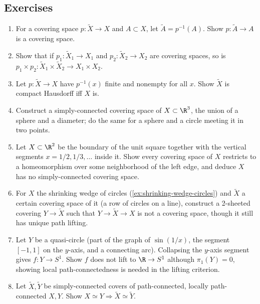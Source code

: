 \subsection*{Exercises}

\begin{enumerate}
\item For a covering space $p:\tilde X\to X$ and $A\subset X$, let $\tilde A=p^{-1}(A)$.
Show $p:\tilde A\to A$ is a covering space.

\item Show that if $p_1:\tilde X_1\to X_1$ and $p_2:\tilde X_2\to X_2$ are covering
spaces, so is $p_1\times p_2 : \tilde X_1\times\tilde X_2 \to X_1\times X_2$.

\item Let $p:\tilde X\to X$ have $p^{-1}(x)$ finite and nonempty for all $x$. Show
$\tilde X$ is compact Hausdorff iff $X$ is.

\item Construct a simply-connected covering space of $X\subset\R^3$, the union of
a sphere and a diameter; do the same for a sphere and a circle meeting it in two
points.

\item Let $X\subset\R^2$ be the boundary of the unit square together with the
vertical segments $x=1/2,1/3,\ldots$ inside it. Show every covering space of $X$
restricts to a homeomorphism over some neighborhood of the left edge, and deduce
$X$ has no simply-connected covering space.

\item For $X$ the shrinking wedge of circles (\cref{ex:shrinking-wedge-circles}) and
$\tilde X$ a certain covering space of it (a row of circles on a line), construct a
2-sheeted covering $Y\to\tilde X$ such that $Y\to\tilde X\to X$ is not a covering
space, though it still has unique path lifting.

\item Let $Y$ be a quasi-circle (part of the graph of $\sin(1/x)$, the segment
$[-1,1]$ on the $y$-axis, and a connecting arc). Collapsing the $y$-axis segment
gives $f:Y\to S^1$. Show $f$ does not lift to $\R\to S^1$ although $\pi_1(Y)=0$,
showing local path-connectedness is needed in the lifting criterion.

\item Let $\tilde X,\tilde Y$ be simply-connected covers of path-connected, locally
path-connected $X,Y$. Show $X\simeq Y \Rightarrow \tilde X\simeq\tilde Y$.


\end{enumerate}

